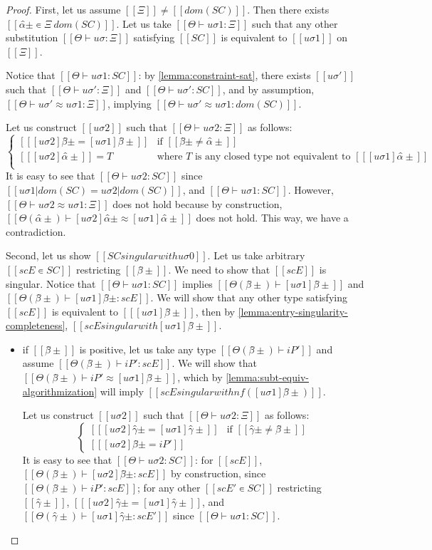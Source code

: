 \lemSingularityCompleteness*
\begin{proof}

    First, let us assume $[[Ξ]] \neq [[dom(SC)]]$. 
    Then there exists $[[α̂± ∊ Ξ \ dom(SC)]]$.
    Let us take $[[Θ ⊢ uσ1 : Ξ]]$ such that 
    any other substitution $[[Θ ⊢ uσ : Ξ]]$ satisfying $[[SC]]$
    is equivalent to $[[uσ1]]$ on $[[Ξ]]$.

    Notice that $[[Θ ⊢ uσ1 : SC]]$: 
    by \cref{lemma:constraint-sat}, there exists $[[uσ']]$
    such that $[[Θ ⊢ uσ' : Ξ]]$ and $[[Θ ⊢ uσ' : SC]]$,
    and by assumption, $[[Θ ⊢ uσ' ≈ uσ1 : Ξ]]$,
    implying  $[[Θ ⊢ uσ' ≈ uσ1 : dom(SC)]]$.

    Let us construct $[[uσ2]]$ such that $[[Θ ⊢ uσ2 : Ξ]]$ as
    follows:
    $$
    \begin{cases}
        [[ [uσ2]β̂± = [uσ1]β̂±  ]] & \text{if } [[β̂± ≠ α̂±]] \\
        [[ [uσ2]α̂± ]] = T & \text{where $T$ is any closed type not equivalent to $[[ [uσ1]α̂± ]]$} \\
    \end{cases}
    $$
    It is easy to see that $[[Θ ⊢ uσ2 : SC]]$ since
    $[[uσ1|dom(SC) = uσ2|dom(SC)]]$, and $[[Θ ⊢ uσ1 : SC]]$.
    However, $[[Θ ⊢ uσ2 ≈ uσ1 : Ξ]]$ does not hold because
    by construction, $[[Θ(α̂±) ⊢ [uσ2]α̂± ≈ [uσ1]α̂±]]$ does not hold. 
    This way, we have a contradiction.

    Second, let us show $[[SC singular with uσ0]]$.
    Let us take arbitrary $[[scE ∊ SC]]$ restricting $[[β̂±]]$.
    We need to show that $[[scE]]$ is singular.
    Notice that $[[Θ ⊢ uσ1 : SC]]$ implies $[[Θ(β̂±) ⊢ [uσ1]β̂±]]$ and $[[Θ(β̂±) ⊢ [uσ1]β̂± : scE ]]$.
    We will show that any other type satisfying $[[scE]]$ is equivalent to $[[ [uσ1]β̂± ]]$,
    then by \cref{lemma:entry-singularity-completeness}, $[[scE singular with [uσ1]β̂± ]]$.
    \begin{itemize}
        \item if $[[β̂±]]$ is positive, 
            let us take any type $[[Θ(β̂±) ⊢ iP']]$
            and assume $[[Θ(β̂±) ⊢ iP' : scE]]$.
            We will show that $[[Θ(β̂±) ⊢ iP' ≈ [uσ1]β̂±]]$,
            which by \cref{lemma:subt-equiv-algorithmization} will
            imply $[[scE singular with nf([uσ1]β̂±)]]$.

            Let us construct $[[uσ2]]$ such that $[[Θ ⊢ uσ2 : Ξ]]$ as
            follows:
            $$
            \begin{cases}
                [[ [uσ2]γ̂± = [uσ1]γ̂±  ]] & \text{if } [[γ̂± ≠ β̂±]] \\
                [[ [uσ2]β̂± = iP' ]]
            \end{cases}
            $$
            It is easy to see that $[[Θ ⊢ uσ2 : SC]]$:
            for $[[scE]]$, $[[Θ(β̂±) ⊢ [uσ2]β̂± : scE ]]$ by construction,
            since $[[Θ(β̂±) ⊢ iP' : scE]]$; for any other $[[scE' ∊ SC]]$
            restricting $[[γ̂±]]$, $[[ [uσ2]γ̂± = [uσ1]γ̂± ]]$, 
            and $[[Θ(γ̂±) ⊢ [uσ1]γ̂± : scE' ]]$ since $[[Θ ⊢ uσ1 : SC]]$.


\end{itemize}
\end{proof}
